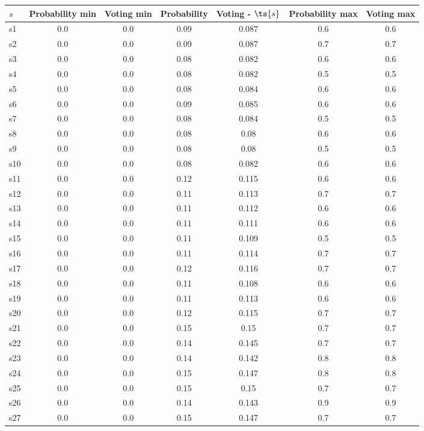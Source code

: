 \documentclass{article}
\begin{document}
\noindent\begin{tabular}{|l|c|c|c|c|c|c|}
\hline
$s$& Probability min & Voting min & Probability & Voting - $\ts{s}$ & Probability max & Voting max\\
\hline
s1 &0.0 & 0.0 & 0.09 & 0.087 & 0.6 & 0.6\\
\hline
s2 &0.0 & 0.0 & 0.09 & 0.087 & 0.7 & 0.7\\
\hline
s3 &0.0 & 0.0 & 0.08 & 0.082 & 0.6 & 0.6\\
\hline
s4 &0.0 & 0.0 & 0.08 & 0.082 & 0.5 & 0.5\\
\hline
s5 &0.0 & 0.0 & 0.08 & 0.084 & 0.6 & 0.6\\
\hline
s6 &0.0 & 0.0 & 0.09 & 0.085 & 0.6 & 0.6\\
\hline
s7 &0.0 & 0.0 & 0.08 & 0.084 & 0.5 & 0.5\\
\hline
s8 &0.0 & 0.0 & 0.08 & 0.08 & 0.6 & 0.6\\
\hline
s9 &0.0 & 0.0 & 0.08 & 0.08 & 0.5 & 0.5\\
\hline
s10 &0.0 & 0.0 & 0.08 & 0.082 & 0.6 & 0.6\\
\hline
s11 &0.0 & 0.0 & 0.12 & 0.115 & 0.6 & 0.6\\
\hline
s12 &0.0 & 0.0 & 0.11 & 0.113 & 0.7 & 0.7\\
\hline
s13 &0.0 & 0.0 & 0.11 & 0.112 & 0.6 & 0.6\\
\hline
s14 &0.0 & 0.0 & 0.11 & 0.111 & 0.6 & 0.6\\
\hline
s15 &0.0 & 0.0 & 0.11 & 0.109 & 0.5 & 0.5\\
\hline
s16 &0.0 & 0.0 & 0.11 & 0.114 & 0.7 & 0.7\\
\hline
s17 &0.0 & 0.0 & 0.12 & 0.116 & 0.7 & 0.7\\
\hline
s18 &0.0 & 0.0 & 0.11 & 0.108 & 0.6 & 0.6\\
\hline
s19 &0.0 & 0.0 & 0.11 & 0.113 & 0.6 & 0.6\\
\hline
s20 &0.0 & 0.0 & 0.12 & 0.115 & 0.7 & 0.7\\
\hline
s21 &0.0 & 0.0 & 0.15 & 0.15 & 0.7 & 0.7\\
\hline
s22 &0.0 & 0.0 & 0.14 & 0.145 & 0.7 & 0.7\\
\hline
s23 &0.0 & 0.0 & 0.14 & 0.142 & 0.8 & 0.8\\
\hline
s24 &0.0 & 0.0 & 0.15 & 0.147 & 0.8 & 0.8\\
\hline
s25 &0.0 & 0.0 & 0.15 & 0.15 & 0.7 & 0.7\\
\hline
s26 &0.0 & 0.0 & 0.14 & 0.143 & 0.9 & 0.9\\
\hline
s27 &0.0 & 0.0 & 0.15 & 0.147 & 0.7 & 0.7\\

\end{tabular}
\end{document}
